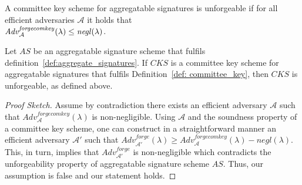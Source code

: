 \noindent A committee key scheme for aggregatable signatures is unforgeable if for all efficient adversaries $\mathcal{A}$ it holds that \\ 
$\mathit{Adv}_{\mathcal{A}}^{\mathit{forgecomkey}}(\lambda) \leq \mathit{negl}(\lambda)$.
\begin{corollary} Let $\mathit{AS}$ be an aggregatable signature scheme that fulfils  
definition~\ref{def:aggregate_signatures}. If $\mathit{CKS}$ is a committee key scheme for aggregatable signatures that fulfils Definition~\ref{def: committee_key}, 
then $\mathit{CKS}$ is unforgeable, as defined above.  
\end{corollary}

\begin{proof}[Proof Sketch] Assume by contradiction there exists an efficient adversary $\mathcal{A}$ such that 
$\mathit{Adv}_{\mathcal{A}}^{\mathit{forgecomkey}}(\lambda)$ is non-negligible. Using $\mathcal{A}$ and the 
soundness property of a committee key scheme, one can construct in a straightforward manner an efficient 
adversary $\mathcal{A'}$ such that $ \mathit{Adv}_{\mathcal{A'}}^{\mathit{forge}}(\lambda) \geq \mathit{Adv}_{\mathcal{A}}^{\mathit{forgecomkey}}(\lambda)  - \mathit{negl}(\lambda).$ 
This, in turn, implies that $\mathit{Adv}_{\mathcal{A'}}^{\mathit{forge}}$ is non-negligible which contradicts the unforgeability property of aggregatable 
signature scheme $\mathit{AS}$. Thus, our assumption is false and our statement holds.
\end{proof}
\vspace{-0.15in}
